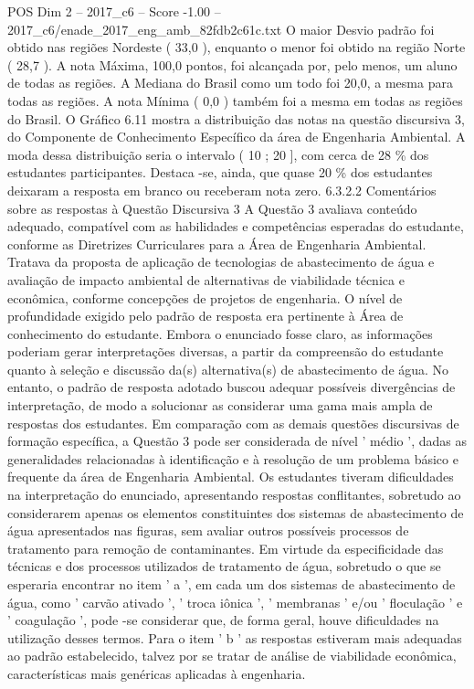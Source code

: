 \begin{textsample}{POS Dim 2 – 2017\_c6 – Score -1.00 – 2017\_c6/enade\_2017\_eng\_amb\_82fdb2c61c.txt}
O maior Desvio padrão foi obtido nas regiões Nordeste ( 33,0 ), enquanto o menor foi obtido na região Norte ( 28,7 ).
A nota Máxima, 100,0 pontos, foi alcançada por, pelo menos, um aluno de todas as regiões.
A Mediana do Brasil como um todo foi 20,0, a mesma para todas as regiões.
A nota Mínima ( 0,0 ) também foi a mesma em todas as regiões do Brasil.
O Gráfico 6.11 mostra a distribuição das notas na questão discursiva 3, do Componente de Conhecimento Específico da área de Engenharia Ambiental.
A moda dessa distribuição seria o intervalo ( 10 ; 20 ], com cerca de 28 \% dos estudantes participantes.
Destaca -se, ainda, que quase 20 \% dos estudantes deixaram a resposta em branco ou receberam nota zero. 6.3.2.2 Comentários sobre as respostas à Questão Discursiva 3 A Questão 3 avaliava conteúdo adequado, compatível com as habilidades e competências esperadas do estudante, conforme as Diretrizes Curriculares para a Área de Engenharia Ambiental.
Tratava da proposta de aplicação de tecnologias de abastecimento de água e avaliação de impacto ambiental de alternativas de viabilidade técnica e econômica, conforme concepções de projetos de engenharia.
O nível de profundidade exigido pelo padrão de resposta era pertinente à Área de conhecimento do estudante.
Embora o enunciado fosse claro, as informações poderiam gerar interpretações diversas, a partir da compreensão do estudante quanto à seleção e discussão da(s) alternativa(s) de abastecimento de água.
No entanto, o padrão de resposta adotado buscou adequar possíveis divergências de interpretação, de modo a solucionar as considerar uma gama mais ampla de respostas dos estudantes.
Em comparação com as demais questões discursivas de formação específica, a Questão 3 pode ser considerada de nível ' médio ', dadas as generalidades relacionadas à identificação e à resolução de um problema básico e frequente da área de Engenharia Ambiental.
Os estudantes tiveram dificuldades na interpretação do enunciado, apresentando respostas conflitantes, sobretudo ao considerarem apenas os elementos constituintes dos sistemas de abastecimento de água apresentados nas figuras, sem avaliar outros possíveis processos de tratamento para remoção de contaminantes.
Em virtude da especificidade das técnicas e dos processos utilizados de tratamento de água, sobretudo o que se esperaria encontrar no item ' a ', em cada um dos sistemas de abastecimento de água, como ' carvão ativado ', ' troca iônica ', ' membranas ' e/ou ' floculação ' e ' coagulação ', pode -se considerar que, de forma geral, houve dificuldades na utilização desses termos.
Para o item ' b ' as respostas estiveram mais adequadas ao padrão estabelecido, talvez por se tratar de análise de viabilidade econômica, características mais genéricas aplicadas à engenharia.

\end{textsample}
